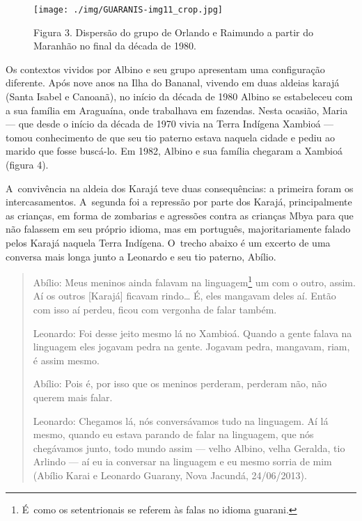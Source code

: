 \begin{figure}
  \centering
 \texttt{[image: ./img/GUARANIS-img11\_crop.jpg]}	
  \hfill
  \caption{Figura 3. Dispersão do grupo de Orlando e Raimundo a partir do Maranhão no final da década de 1980.}
  \end{figure}
 
 

Os contextos vividos por Albino e seu grupo apresentam uma configuração
diferente. Após nove anos na Ilha do Bananal, vivendo em duas aldeias
karajá (Santa Isabel e Canoanã), no início da década de 1980 Albino se
estabeleceu com a sua família em Araguaína, onde trabalhava em
fazendas. Nesta ocasião, Maria --- que desde o início da década de 1970
vivia na Terra Indígena Xambioá --- tomou conhecimento de que seu tio
paterno estava naquela cidade e pediu ao marido que fosse buscá-lo. Em
1982, Albino e sua família chegaram a Xambioá (figura 4). 

A~convivência na aldeia dos Karajá teve duas consequências: a primeira
foram os intercasamentos. A~segunda foi a repressão por parte dos
Karajá, principalmente as crianças, em forma de zombarias e agressões
contra as crianças Mbya para que não falassem em seu próprio idioma,
mas em português, majoritariamente falado pelos Karajá naquela Terra
Indígena. O~trecho abaixo é um excerto de uma conversa mais longa junto
a Leonardo e seu tio paterno, Abílio. 

\begin{quote}
\noindent{}Abílio: Meus meninos ainda falavam na linguagem\footnote{É~como os
setentrionais se referem às falas no idioma guarani.} um com o outro,
assim. Aí os outros [Karajá] ficavam rindo\ldots{} É, eles mangavam deles
aí. Então com isso aí perdeu, ficou com vergonha de falar também.

\noindent{}Leonardo: Foi desse jeito mesmo lá no Xambioá. Quando a gente falava na
linguagem eles jogavam pedra na gente. Jogavam pedra, mangavam, riam, é
assim mesmo. 

\noindent{}Abílio: Pois é, por isso que os meninos perderam, perderam não, não
querem mais falar.

\noindent{}Leonardo: Chegamos lá, nós conversávamos tudo na linguagem. Aí lá mesmo,
quando eu estava parando de falar na linguagem, que nós chegávamos
junto, todo mundo assim --- velho Albino, velha Geralda, tio Arlindo --- aí
eu ia conversar na linguagem e eu mesmo sorria de mim (Abílio Karai e
Leonardo Guarany, Nova Jacundá, 24/06/2013).
\end{quote}

